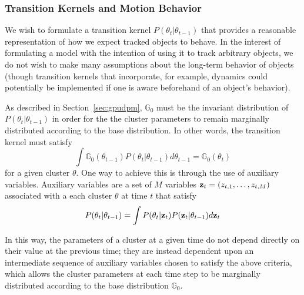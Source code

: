 \documentclass{article}
\begin{document}
\subsubsection{Transition Kernels and Motion Behavior}

We wish to formulate a transition kernel $P(\theta_{t} | \theta_{t-1})$ that provides a reasonable representation of how we expect tracked objects to behave. In the interest of formulating a model with the intention of using it to track arbitrary objects, we do not wish to make many assumptions about the long-term behavior of objects (though transition kernels that incorporate, for example, dynamics could potentially be implemented if one is aware beforehand of an object's behavior).

As described in Section~\ref{sec:gpudpm}, $\mathbb{G}_{0}$ must be the invariant distribution of $P(\theta_{t} | \theta_{t-1})$ in order for the the cluster parameters to remain marginally distributed according to the base distribution. In other words, the transition kernel must satisfy
\begin{equation}
\int \mathbb{G}_{0}(\theta_{t-1})P(\theta_{t} | \theta_{t-1}) d\theta_{t-1} = \mathbb{G}_{0}(\theta_{t})
\end{equation}
for a given cluster $\theta$. One way to achieve this is through the use of auxiliary variables. Auxiliary variables are a set of $M$ variables $\bold{z}_{t} = (z_{t,1}, \ldots, z_{t,M})$ associated with a each cluster $\theta$ at time $t$ that satisfy
\begin{eqnarray}
P(\theta_{t} | \theta_{t-1}) = \int P(\theta_{t} | \bold{z}_{t}) P(\bold{z}_{t} | \theta_{t-1}) d \bold{z}_{t}  %
\end{eqnarray}

In this way, the parameters of a cluster at a given time do not depend directly on their value at the previous time; they are instead dependent upon an intermediate sequence of auxiliary variables chosen to satisfy the above criteria, which allows the cluster parameters at each time step to be marginally distributed according to the base distribution $\mathbb{G}_{0}$.
\end{document}
